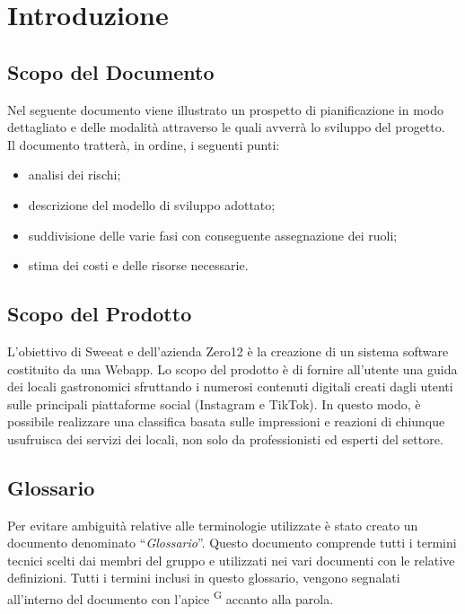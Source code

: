 \section{Introduzione}

\subsection{Scopo del Documento}
Nel seguente documento viene illustrato un prospetto di pianificazione in modo dettagliato e delle modalità attraverso le quali avverrà lo sviluppo del progetto. \mbox{} \\
Il documento tratterà, in ordine, i seguenti punti:
\begin{itemize}
\item analisi dei rischi;
\item descrizione del modello di sviluppo adottato;
\item suddivisione delle varie fasi con conseguente assegnazione dei ruoli;
\item stima dei costi e delle risorse necessarie.
\end{itemize}

\subsection{Scopo del Prodotto}

L’obiettivo di Sweeat e dell’azienda Zero12 è la creazione di un sistema software costituito da una Webapp. Lo scopo del prodotto è di fornire all’utente una guida dei locali gastronomici sfruttando i numerosi contenuti digitali creati dagli utenti sulle principali piattaforme social (Instagram e TikTok). In questo modo, è possibile realizzare una classifica basata sulle impressioni e reazioni di chiunque usufruisca dei servizi dei locali, non solo da professionisti ed esperti del settore.

\subsection{Glossario}

Per evitare ambiguità relative alle terminologie utilizzate è stato creato un documento denominato “\textit{Glossario}”. Questo documento comprende tutti i termini tecnici scelti dai membri del gruppo e utilizzati nei vari documenti con le relative definizioni. Tutti i termini inclusi in questo glossario, vengono segnalati all’interno del documento con l’apice \textsuperscript{G} accanto alla parola.

